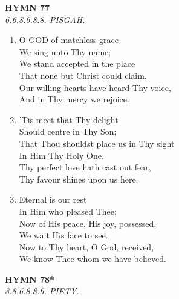 \documentclass[11pt,a4paper]{article}
\begin{document}
\newpage
\begin{center}
    {\Large \textbf{HYMN 77}}
    \\
    \textit{6.6.8.6.8.8. PISGAH.}
\end{center}
\vspace{1em}

\begin{enumerate}
    \item O GOD of matchless grace \\
        We sing unto Thy name; \\
        We stand accepted in the place \\
        That none but Christ could claim. \\
        Our willing hearts have heard Thy voice, \\
        And in Thy mercy we rejoice.

    \item 'Tis meet that Thy delight \\
        Should centre in Thy Son; \\
        That Thou shouldst place us in Thy sight \\
        In Him Thy Holy One. \\
        Thy perfect love hath cast out fear, \\
        Thy favour shines upon us here.

    \item Eternal is our rest \\
        In Him who pleas\`ed Thee; \\
        Now of His peace, His joy, possessed, \\
        We wait His face to see. \\
        Now to Thy heart, O God, received, \\
        We know Thee whom we have believed.

\end{enumerate}

\newpage
\begin{center}
    {\Large \textbf{HYMN 78*}}
    \\
    \textit{8.8.6.8.8.6. PIETY.}
\end{center}
\vspace{1em}
\end{document}

